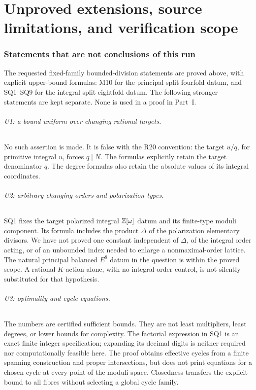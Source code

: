 \newpage
\part{Unproved extensions, source limitations, and verification scope}\label{part:open}
\section{Statements that are not conclusions of this run}
The requested fixed-family bounded-division statements are proved above, with explicit upper-bound formulas: M10 for the principal split fourfold datum, and SQ1--SQ9 for the integral split eightfold datum. The following stronger statements are kept separate. None is used in a proof in Part~I.

\paragraph{U1: a bound uniform over changing rational targets.}
No such assertion is made. It is false with the R20 convention: the target $u/q$, for primitive integral $u$, forces $q\mid N$. The formulas explicitly retain the target denominator $q$. The degree formulas also retain the absolute values of its integral coordinates.

\paragraph{U2: arbitrary changing orders and polarization types.}
SQ1 fixes the target polarized integral $\mathbb Z[\omega]$ datum and its finite-type moduli component. Its formula includes the product $\Delta$ of the polarization elementary divisors. We have not proved one constant independent of $\Delta$, of the integral order acting, or of an unbounded index needed to enlarge a nonmaximal-order lattice. The natural principal balanced $E^8$ datum in the question is within the proved scope. A rational $K$-action alone, with no integral-order control, is not silently substituted for that hypothesis.

\paragraph{U3: optimality and cycle equations.}
The numbers are certified sufficient bounds. They are not least multipliers, least degrees, or lower bounds for complexity. The factorial expression in SQ1 is an exact finite integer specification; expanding its decimal digits is neither required nor computationally feasible here. The proof obtains effective cycles from a finite spanning construction and proper intersections, but does not print equations for a chosen cycle at every point of the moduli space. Closedness transfers the explicit bound to all fibres without selecting a global cycle family.

